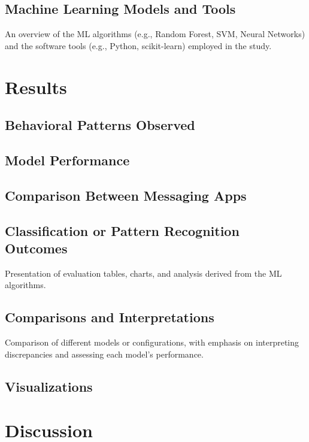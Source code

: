 \documentclass[a4paper,12pt]{report}
\begin{document}
\section{Machine Learning Models and Tools}
An overview of the ML algorithms (e.g., Random Forest, SVM, Neural Networks) and the software tools (e.g., Python, scikit-learn) employed in the study.




\chapter{Results}
\section{Behavioral Patterns Observed}

\section{Model Performance}

\section{Comparison Between Messaging Apps}

\section{Classification or Pattern Recognition Outcomes}
Presentation of evaluation tables, charts, and analysis derived from the ML algorithms.

\section{Comparisons and Interpretations}
Comparison of different models or configurations, with emphasis on interpreting discrepancies and assessing each model’s performance.

\section{ Visualizations}

\chapter{Discussion}
\end{document}
